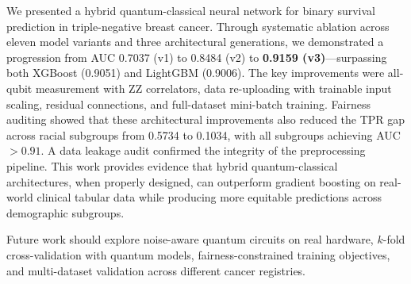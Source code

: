 \documentclass[12pt, letterpaper]{article}
\begin{document}
We presented a hybrid quantum-classical neural network for binary survival prediction in triple-negative breast cancer. Through systematic ablation across eleven model variants and three architectural generations, we demonstrated a progression from AUC 0.7037 (v1) to 0.8484 (v2) to \textbf{0.9159 (v3)}---surpassing both XGBoost (0.9051) and LightGBM (0.9006). The key improvements were all-qubit measurement with ZZ correlators, data re-uploading with trainable input scaling, residual connections, and full-dataset mini-batch training. Fairness auditing showed that these architectural improvements also reduced the TPR gap across racial subgroups from 0.5734 to 0.1034, with all subgroups achieving AUC $> 0.91$. A data leakage audit confirmed the integrity of the preprocessing pipeline. This work provides evidence that hybrid quantum-classical architectures, when properly designed, can outperform gradient boosting on real-world clinical tabular data while producing more equitable predictions across demographic subgroups.

Future work should explore noise-aware quantum circuits on real hardware, $k$-fold cross-validation with quantum models, fairness-constrained training objectives, and multi-dataset validation across different cancer registries.


\break
\end{document}
